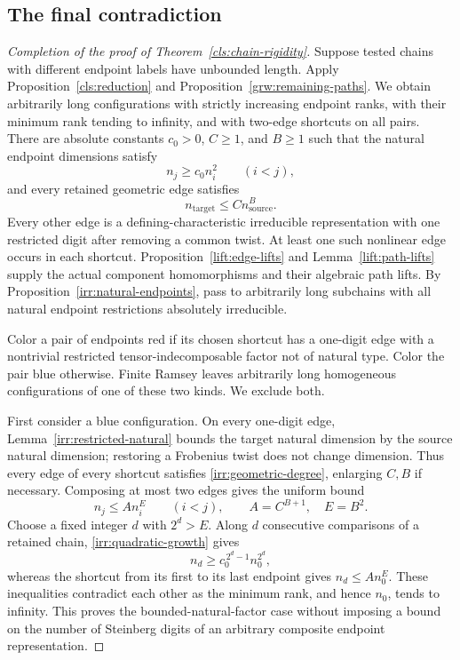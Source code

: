 \subsection{The final contradiction}

\begin{proof}[Completion of the proof of Theorem~\ref{cls:chain-rigidity}]
Suppose tested chains with different endpoint labels have unbounded length.
Apply Proposition~\ref{cls:reduction} and
Proposition~\ref{grw:remaining-paths}.
We obtain arbitrarily long configurations with strictly increasing endpoint
ranks, with their minimum rank tending to infinity, and with two-edge
shortcuts on all pairs.  There are absolute constants $c_0>0$, $C\geq1$,
and $B\geq1$ such that the natural endpoint dimensions satisfy
\begin{equation}
 n_j\geq c_0 n_i^2\qquad(i<j),
 \label{irr:quadratic-growth}
\end{equation}
and every retained geometric edge satisfies
\begin{equation}
 n_{\mathrm{target}}\leq C n_{\mathrm{source}}^B.
 \label{irr:geometric-degree}
\end{equation}
Every other edge is a defining-characteristic irreducible representation
with one restricted digit after removing a common twist.  At least one
such nonlinear edge occurs in each shortcut.
Proposition~\ref{lift:edge-lifts} and Lemma~\ref{lift:path-lifts} supply the actual
component homomorphisms and their algebraic path lifts.
By Proposition~\ref{irr:natural-endpoints}, pass to arbitrarily long
subchains with all natural endpoint restrictions absolutely irreducible.

Color a pair of endpoints red if its chosen shortcut has a one-digit edge
with a nontrivial restricted tensor-indecomposable factor not of natural
type.  Color the pair blue otherwise.
Finite Ramsey leaves arbitrarily long homogeneous configurations of one
of these two kinds.  We exclude both.

First consider a blue configuration.  On every one-digit edge,
Lemma~\ref{irr:restricted-natural} bounds the target natural dimension by
the source natural dimension; restoring a Frobenius twist does not change
dimension.  Thus every edge of every shortcut satisfies
\eqref{irr:geometric-degree}, enlarging $C,B$ if necessary.
Composing at most two edges gives the uniform bound
\begin{equation}
 n_j\leq A n_i^E\qquad(i<j),\qquad
 A=C^{B+1},\quad E=B^2.
 \label{irr:pair-degree}
\end{equation}
Choose a fixed integer $d$ with $2^d>E$.
Along $d$ consecutive comparisons of a retained chain,
\eqref{irr:quadratic-growth} gives
\[
 n_d\geq c_0^{\,2^d-1}n_0^{2^d},
\]
whereas the shortcut from its first to its last endpoint gives
$n_d\leq A n_0^E$.
These inequalities contradict each other as the minimum rank, and hence
$n_0$, tends to infinity.  This proves the bounded-natural-factor case
without imposing a bound on the number of Steinberg digits of an arbitrary
composite endpoint representation.


\end{proof}
